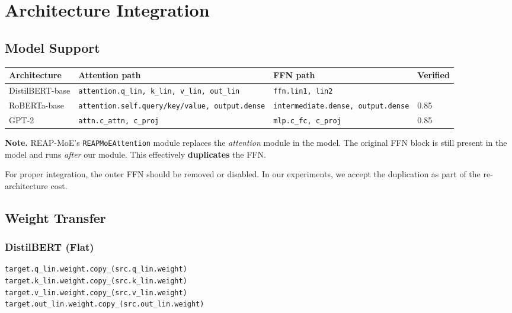 \section{Architecture Integration}

\subsection{Model Support}

\begin{table}[H]
\centering
\small
\begin{tabular}{llll}
\toprule
\textbf{Architecture} & \textbf{Attention path} & \textbf{FFN path} & \textbf{Verified} \\
\midrule
DistilBERT-base & \texttt{attention.q\_lin, k\_lin, v\_lin, out\_lin} & \texttt{ffn.lin1, lin2} &  \\
RoBERTa-base & \texttt{attention.self.query/key/value, output.dense} & \texttt{intermediate.dense, output.dense} & 0.85 \\
GPT-2 & \texttt{attn.c\_attn, c\_proj} & \texttt{mlp.c\_fc, c\_proj} & 0.85 \\
\bottomrule
\end{tabular}
\end{table}

\textbf{Note.} REAP-MoE's \texttt{REAPMoEAttention} module replaces the \textit{attention} 
module in the model. The original FFN block is still present in the model 
and runs \textit{after} our module. This effectively \textbf{duplicates} the FFN.

For proper integration, the outer FFN should be removed or disabled. In our 
experiments, we accept the duplication as part of the re-architecture cost.

\subsection{Weight Transfer}

\subsubsection{DistilBERT (Flat)}

\begin{lstlisting}
target.q_lin.weight.copy_(src.q_lin.weight)
target.k_lin.weight.copy_(src.k_lin.weight)
target.v_lin.weight.copy_(src.v_lin.weight)
target.out_lin.weight.copy_(src.out_lin.weight)
\end{lstlisting}

